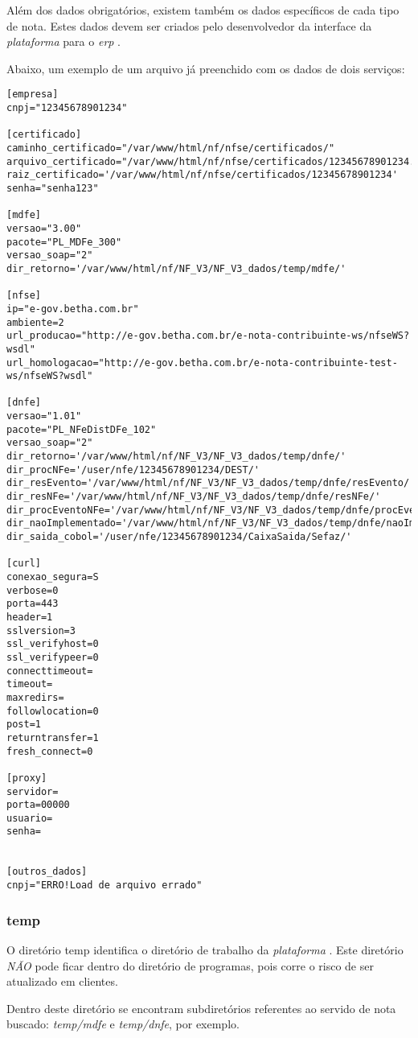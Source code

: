 \documentclass[a4paper]{article}
\newcommand{\nf}{\emph{plataforma} }
\newcommand{\erp}{\emph{erp} }
\newcommand{\dev}{desenvolvedor }
\begin{document}
Além dos dados obrigatórios, existem também os dados específicos de cada tipo de nota. Estes dados devem ser criados pelo \dev  da interface da \nf para o \erp.

Abaixo, um exemplo de um arquivo já preenchido com os dados de dois serviços:
\begin{lstlisting}
[empresa]
cnpj="12345678901234"

[certificado]
caminho_certificado="/var/www/html/nf/nfse/certificados/"
arquivo_certificado="/var/www/html/nf/nfse/certificados/12345678901234.pfx"
raiz_certificado='/var/www/html/nf/nfse/certificados/12345678901234'
senha="senha123"

[mdfe]
versao="3.00"
pacote="PL_MDFe_300"
versao_soap="2"
dir_retorno='/var/www/html/nf/NF_V3/NF_V3_dados/temp/mdfe/'

[nfse]
ip="e-gov.betha.com.br"
ambiente=2
url_producao="http://e-gov.betha.com.br/e-nota-contribuinte-ws/nfseWS?wsdl"
url_homologacao="http://e-gov.betha.com.br/e-nota-contribuinte-test-ws/nfseWS?wsdl"

[dnfe]
versao="1.01"
pacote="PL_NFeDistDFe_102"
versao_soap="2"
dir_retorno='/var/www/html/nf/NF_V3/NF_V3_dados/temp/dnfe/'
dir_procNFe='/user/nfe/12345678901234/DEST/'
dir_resEvento='/var/www/html/nf/NF_V3/NF_V3_dados/temp/dnfe/resEvento/'
dir_resNFe='/var/www/html/nf/NF_V3/NF_V3_dados/temp/dnfe/resNFe/'
dir_procEventoNFe='/var/www/html/nf/NF_V3/NF_V3_dados/temp/dnfe/procEventoNFe/'
dir_naoImplementado='/var/www/html/nf/NF_V3/NF_V3_dados/temp/dnfe/naoImplementado/'
dir_saida_cobol='/user/nfe/12345678901234/CaixaSaida/Sefaz/'

[curl]
conexao_segura=S
verbose=0
porta=443
header=1
sslversion=3
ssl_verifyhost=0
ssl_verifypeer=0
connecttimeout=
timeout=
maxredirs=
followlocation=0
post=1
returntransfer=1
fresh_connect=0

[proxy]
servidor=
porta=00000
usuario=
senha=


[outros_dados]
cnpj="ERRO!Load de arquivo errado"
\end{lstlisting}

\subsubsection{temp}
O diretório temp identifica o diretório de trabalho da \nf. Este diretório \emph{NÃO} pode ficar dentro do diretório de programas, pois corre o risco de ser atualizado em clientes.

Dentro deste diretório se encontram subdiretórios referentes ao servido de nota buscado: \emph{temp/mdfe} e \emph{temp/dnfe}, por exemplo.
\end{document}

